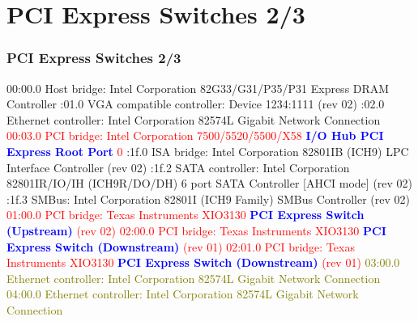 \documentclass[aspectratio=169]{beamer}
\begin{document}
\section{PCI Express Switches 2/3}
\begin{frame}
\frametitle{PCI Express Switches 2/3}
\begin{block}{}
\small
00:00.0 Host bridge: Intel Corporation 82G33/G31/P35/P31 Express DRAM Controller :01.0 VGA compatible controller: Device 1234:1111 (rev 02) :02.0 Ethernet controller: Intel Corporation 82574L Gigabit Network Connection \newline
\textcolor{red}{00:03.0 PCI bridge: Intel Corporation 7500/5520/5500/X58 \textbf{\textcolor{blue}{I/O Hub PCI Express Root Port}} 0} :1f.0 ISA bridge: Intel Corporation 82801IB (ICH9) LPC Interface Controller (rev 02) :1f.2 SATA controller: Intel Corporation 82801IR/IO/IH (ICH9R/DO/DH) 6 port SATA Controller [AHCI mode] (rev 02) :1f.3 SMBus: Intel Corporation 82801I (ICH9 Family) SMBus Controller (rev 02) \newline
\textcolor{red}{01:00.0 PCI bridge: Texas Instruments XIO3130 \textbf{\textcolor{blue}{PCI Express Switch (Upstream)}} (rev 02)} \newline
\textcolor{red}{02:00.0 PCI bridge: Texas Instruments XIO3130 \textbf{\textcolor{blue}{PCI Express Switch (Downstream)}} (rev 01)} \newline
\textcolor{red}{02:01.0 PCI bridge: Texas Instruments XIO3130 \textbf{\textcolor{blue}{PCI Express Switch (Downstream)}} (rev 01)} \newline
\textcolor{olive}{03:00.0 Ethernet controller: Intel Corporation 82574L Gigabit Network Connection} \newline
\textcolor{olive}{04:00.0 Ethernet controller: Intel Corporation 82574L Gigabit Network Connection}
\end{block}
\end{frame}

\end{document}
